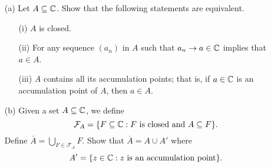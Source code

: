 \documentclass[a4paper]{article}
\begin{document}
\begin{problem}
   \begin{enumerate}
       \item[(a)] Let \( A \subseteq  \mathbb{C}  \). Show that the following statements are equivalent.
           \begin{enumerate}
               \item[(i)] \( A  \) is closed.
                \item[(ii)] For any sequence \( ({a}_{n}) \) in \( A  \) such that \( {a}_{n} \to a \in \mathbb{C}  \) implies that \( a \in A  \).
                \item[(iii)] \( A  \) contains all its accumulation points;  that is, if \( a \in \mathbb{C}  \) is an accumulation point of \( A  \), then \( a \in A  \). 
           \end{enumerate}
        \item[(b)] Given a set \( A \subseteq \mathbb{C} \), we define 
            \[  {\mathcal{F}}_{A} = \{ F \subseteq \C : F \ \text{is closed and} \ A \subseteq F  \}. \]
            Define \( \overline{A} = \bigcup_{ F \in {\mathcal{F}}_{A} }^{  }  F  \). Show that \( \overline{A} = A \cup A' \) where 
            \[  A' = \{ z \in \mathbb{C} : z \ \text{is an accumulation point} \}.  \]
   \end{enumerate} 
\end{problem}
\end{document}
